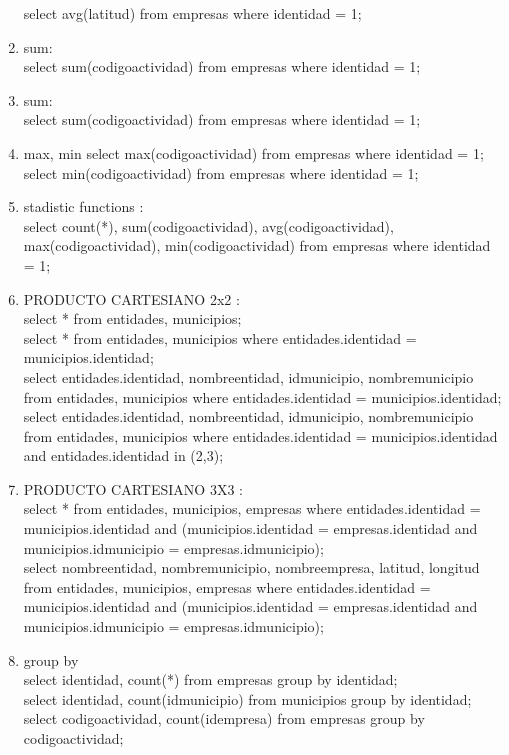 \documentclass[10pt]{article}         %
\begin{document}
\begin{enumerate}
   select avg(latitud)  from empresas where identidad = 1;
\item sum: \\
   select sum(codigoactividad)  from empresas where identidad = 1;   
\item sum: \\
   select sum(codigoactividad)  from empresas where identidad = 1;   
\item max, min
   select max(codigoactividad)  from empresas where identidad = 1;
   select min(codigoactividad)  from empresas where identidad = 1;   
\item stadistic functions : \\
select count(*), sum(codigoactividad), avg(codigoactividad), max(codigoactividad), min(codigoactividad)  from empresas where identidad = 1;

\item PRODUCTO CARTESIANO 2x2 : \\
 select * from entidades, municipios; \\     
 select * from entidades, municipios where entidades.identidad = municipios.identidad; \\
 select entidades.identidad, nombreentidad, idmunicipio, nombremunicipio from entidades, municipios where entidades.identidad = municipios.identidad;\\
 select entidades.identidad, nombreentidad, idmunicipio, nombremunicipio from entidades, municipios where entidades.identidad = municipios.identidad and entidades.identidad in (2,3);
 
\item PRODUCTO CARTESIANO 3X3 : \\
select * from entidades, municipios, empresas where entidades.identidad = municipios.identidad and (municipios.identidad = empresas.identidad and municipios.idmunicipio = empresas.idmunicipio); \\
select nombreentidad, nombremunicipio, nombreempresa, latitud, longitud from entidades, municipios, empresas where entidades.identidad = municipios.identidad and (municipios.identidad = empresas.identidad and municipios.idmunicipio = empresas.idmunicipio);

\item group by \\
 select identidad, count(*) from empresas group by identidad;\\
 select identidad, count(idmunicipio) from municipios group by identidad; \\
 select codigoactividad, count(idempresa) from empresas group by codigoactividad;


\end{enumerate}
\end{document}
